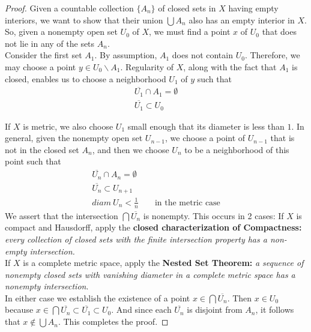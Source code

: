 \documentclass[12pt]{article}
\begin{document}
\begin{proof}
	 Given a countable collection $\{A_n\}$ of closed sets in $X$ having empty interiors, we want to show that their union $\bigcup A_n$ also has an empty interior in $X$. So, given a nonempty open set $U_0$ of $X$, we must find a point $x$ of $U_0$ that does not lie in any of the sets $A_n$. \\

\indent Consider the first set $A_1$. By assumption, $A_1$ does not contain $U_0$. Therefore, we may choose a point $y\in U_0\backslash A_1$. Regularity of $X$, along with the fact that $A_1$ is closed, enables us to choose a neighborhood $U_1$ of $y$ such that 
\begin{align*}
	\overline{U_1}\cap A_1=\emptyset\\
	\overline{U_1}\subset U_0
\end{align*}

If $X$ is metric, we also choose $U_1$ small enough that its diameter is less than $1$. In general, given the nonempty open set $U_{n-1}$, we choose a point of $U_{n-1}$ that is not in the closed set $A_n$, and then we choose $U_n$ to be a neighborhood of this point such that 
\begin{align*}
	\overline{U_n}\cap A_n=\emptyset\\
	\overline{U_n}\subset U_{n+1}\\
	diam\  U_n<\frac{1}{n} &&\text{ in the metric case}
\end{align*}
We assert that the intersection $\bigcap \overline{U_n}$ is nonempty. This occurs in 2 cases: If $X$ is compact and Hausdorff, apply the \textbf{closed characterization of Compactness:} \textit{every collection of closed sets with the finite intersection property has a non-empty intersection.} \\

If $X$ is a complete metric space, apply the \textbf{Nested Set Theorem:} \textit{a sequence of nonempty closed sets with vanishing diameter in a complete metric space has a nonempty intersection}. \\

In either case we establish the existence of a point $x\in \bigcap \overline{U_n}$. Then $x\in U_0$ because $x\in \bigcap \overline{U_n} \subset \overline{U_1} \subset U_0.$ And since each $\overline{U_n}$ is disjoint from $A_n$, it follows that $x\notin \bigcup A_n$. This completes the proof. 
\end{proof}
\end{document}
